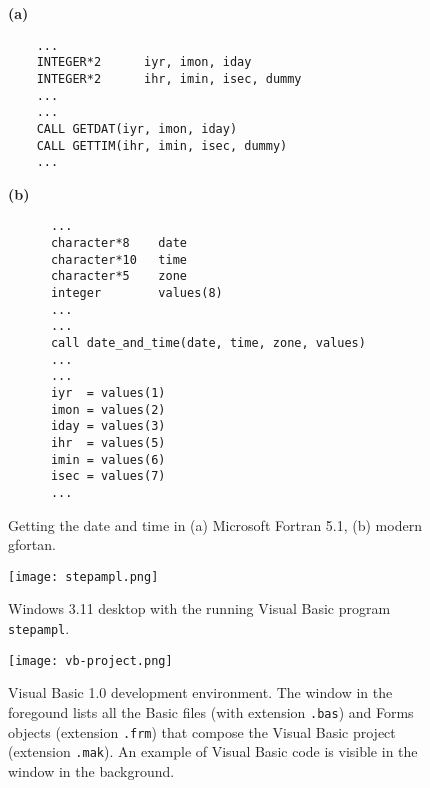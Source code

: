 \begin{supplement}
\begin{figure}[p]
\begin{minipage}{\textwidth}
\textbf{(a)}

\begin{lstlisting}
    ...
    INTEGER*2      iyr, imon, iday
    INTEGER*2      ihr, imin, isec, dummy
    ...
    ...
    CALL GETDAT(iyr, imon, iday)
    CALL GETTIM(ihr, imin, isec, dummy)
    ...

\end{lstlisting}
\end{minipage}
%
\hfill
%
\begin{minipage}{\textwidth}
\textbf{(b)}
\begin{lstlisting}
      ...
      character*8    date
      character*10   time
      character*5    zone
      integer        values(8)
      ...
      ...
      call date_and_time(date, time, zone, values)
      ...
      ...
      iyr  = values(1)
      imon = values(2)
      iday = values(3)
      ihr  = values(5)
      imin = values(6)
      isec = values(7)
      ...

\end{lstlisting}
\end{minipage}

\caption{Getting the date and time in (a) Microsoft Fortran 5.1, (b) modern gfortan.}
\label{fig:date-time}
\end{figure}




\begin{figure}[p]
    \centering
    \texttt{[image: stepampl.png]}
    \caption{Windows 3.11 desktop with the running Visual Basic program \texttt{stepampl}.}
    \label{fig:stepampl}
\end{figure}




\begin{figure}[p]
	\centering
	\texttt{[image: vb-project.png]}
	\caption{Visual Basic 1.0 development environment. The window in the foregound lists all the Basic files (with extension \texttt{.bas}) and Forms objects (extension \texttt{.frm}) that compose the Visual Basic project (extension \texttt{.mak}). An example of Visual Basic code is visible in the window in the background.}
    \label{fig:vb-project}
\end{figure}

\end{supplement}

